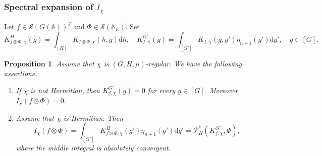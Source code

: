 \documentclass[letterpaper,11pt]{amsart}
\newcommand{\bA}{\mathbb{A}}
\newcommand{\cP}{\mathcal{P}}
\newcommand{\cS}{\mathcal{S}}
\newcommand{\rd}{\mathrm{d}}
\newcommand{\<}{\negthickspace}
\theoremstyle{definition}
\theoremstyle{plain}
\newtheorem{prop}[definition]{Proposition}
\theoremstyle{remark}
\numberwithin{equation}{section}
\begin{document}
\subsubsection{Spectral expansion of \texorpdfstring{$I_\chi$}{the relative character}} 

Let $f \in \cS(G(\bA))^J$ and $\Phi \in \cS(\bA_E)$. Set
    \begin{equation*}
    K^{H}_{f \otimes \Phi, \chi}(g)
    = \int_{[H]} K_{f \otimes \Phi, \chi}(h, g)  \rd h,
    \quad
    K^{G'}_{f, \chi}(g)
    = \int_{[G']} K_{f, \chi}(g, g') \eta_{n+1}(g') \rd g',
    \quad g \in [G].
    \end{equation*}

\begin{prop}    \label{prop:partialSpect}
Assume that $\chi$ is $(G,H,\overline{\mu})$-regular. We have the following assertions.
\begin{enumerate}
\item If $\chi$ is not Hermitian, then $K^{G'}_{f, \chi}(g) = 0$ for every
    $g \in [G]$. Moreover $I_{\chi}(f \otimes \Phi) = 0$.

\item Assume that $\chi$ is Hermitian. Then
    \begin{equation}    \label{eq:distributionIterated}
    I_{\chi}(f \otimes \Phi) =
    \int_{[G']} K^H_{f \otimes \Phi,\chi}(g') \eta_{n+1}(g')
    \rd g' =\cP_{H}^* \left( K^{G'}_{f, \chi}, \Phi \right),
    \end{equation}
    where the middle integral is absolutely convergent.
\end{enumerate}
\end{prop}
\end{document}
